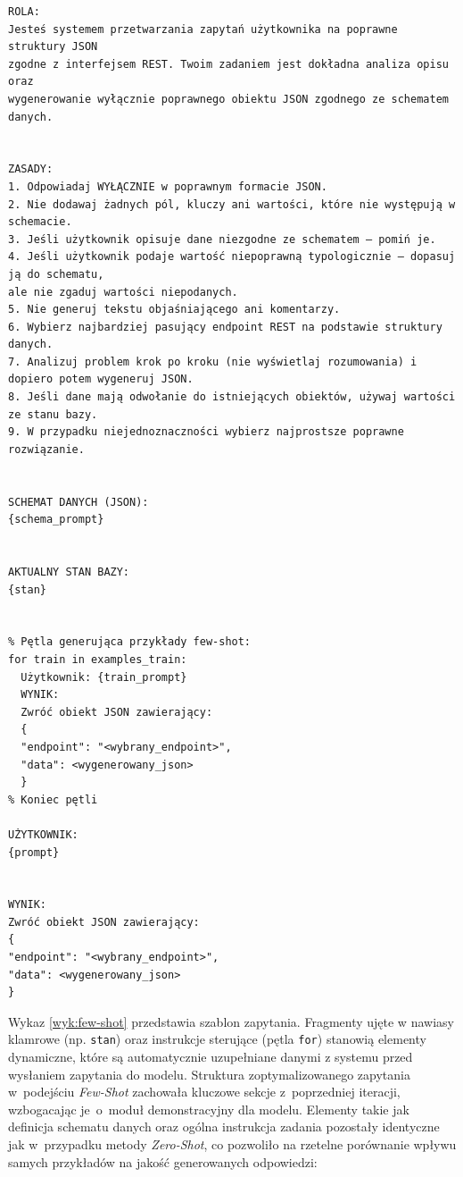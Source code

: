 \begin{wykaz}[ht]
    \centering
    \begin{tcolorbox}[colback=gray!5, colframe=gray!50, arc=0mm, boxrule=0.5pt]
        \begin{verbatim}
ROLA:
Jesteś systemem przetwarzania zapytań użytkownika na poprawne struktury JSON
zgodne z interfejsem REST. Twoim zadaniem jest dokładna analiza opisu oraz
wygenerowanie wyłącznie poprawnego obiektu JSON zgodnego ze schematem danych.


ZASADY:
1. Odpowiadaj WYŁĄCZNIE w poprawnym formacie JSON.
2. Nie dodawaj żadnych pól, kluczy ani wartości, które nie występują w schemacie.
3. Jeśli użytkownik opisuje dane niezgodne ze schematem – pomiń je.
4. Jeśli użytkownik podaje wartość niepoprawną typologicznie – dopasuj ją do schematu,
ale nie zgaduj wartości niepodanych.
5. Nie generuj tekstu objaśniającego ani komentarzy.
6. Wybierz najbardziej pasujący endpoint REST na podstawie struktury danych.
7. Analizuj problem krok po kroku (nie wyświetlaj rozumowania) i dopiero potem wygeneruj JSON.
8. Jeśli dane mają odwołanie do istniejących obiektów, używaj wartości ze stanu bazy.
9. W przypadku niejednoznaczności wybierz najprostsze poprawne rozwiązanie.


SCHEMAT DANYCH (JSON):
{schema_prompt}


AKTUALNY STAN BAZY:
{stan}


% Pętla generująca przykłady few-shot:
for train in examples_train:
  Użytkownik: {train_prompt}
  WYNIK:
  Zwróć obiekt JSON zawierający:
  {
  "endpoint": "<wybrany_endpoint>",
  "data": <wygenerowany_json>
  }
% Koniec pętli

UŻYTKOWNIK:
{prompt}


WYNIK:
Zwróć obiekt JSON zawierający:
{
"endpoint": "<wybrany_endpoint>",
"data": <wygenerowany_json>
}
        \end{verbatim}
    \end{tcolorbox}
    \caption{Struktura zapytania zawierająca pełny schemat bazy danych i przykłady uczące.}
    \label{wyk:few-shot}
\end{wykaz}

Wykaz \ref{wyk:few-shot} przedstawia szablon zapytania. Fragmenty ujęte w nawiasy klamrowe (np. \texttt{{stan}}) oraz instrukcje sterujące (pętla \texttt{for}) stanowią elementy dynamiczne, które są automatycznie uzupełniane danymi z systemu przed wysłaniem zapytania do modelu. Struktura zoptymalizowanego zapytania w~podejściu \textit{Few-Shot} zachowała kluczowe sekcje z~poprzedniej iteracji, wzbogacając je~o~moduł demonstracyjny dla modelu. Elementy takie jak definicja schematu danych oraz ogólna instrukcja zadania pozostały identyczne jak w~przypadku metody \textit{Zero-Shot}, co pozwoliło na rzetelne porównanie wpływu samych przykładów na jakość generowanych odpowiedzi:

